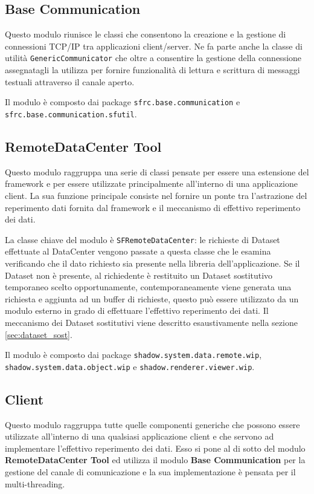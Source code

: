 
\subsection{Base Communication}
\label{sub:basecommodule}
Questo modulo riunisce le classi che consentono la creazione e la gestione di connessioni TCP/IP tra applicazioni client/server. Ne fa parte anche la classe di utilità \texttt{GenericCommunicator} che oltre a consentire la gestione della connessione assegnatagli la utilizza per fornire funzionalità di lettura e scrittura di messaggi testuali attraverso il canale aperto.

Il modulo è composto dai package \texttt{sfrc.base.communication} e \texttt{sfrc.base.communication.sfutil}.

\subsection{RemoteDataCenter Tool}
\label{sub:remotedatacentertoolmodule}
Questo modulo raggruppa una serie di classi pensate per essere una estensione del framework e per essere utilizzate principalmente all'interno di una applicazione client.
La sua funzione principale consiste nel fornire un ponte tra l'astrazione del reperimento dati fornita dal framework e il meccanismo di effettivo reperimento dei dati.

La classe chiave del modulo è \texttt{SFRemoteDataCenter}: le richieste di Dataset effettuate al DataCenter vengono passate a questa classe che le esamina verificando che il dato richiesto sia presente nella libreria dell'applicazione. Se il Dataset non è presente, al richiedente è restituito un Dataset sostitutivo temporaneo scelto opportunamente, contemporaneamente viene generata una richiesta e aggiunta ad un buffer di richieste, questo può essere utilizzato da un modulo esterno in grado di effettuare l'effettivo reperimento dei dati.
Il meccanismo dei Dataset sostitutivi viene descritto esaustivamente nella sezione \ref{sec:dataset_sost}.

Il modulo è composto dai package \texttt{shadow.system.data.remote.wip}, \texttt{shadow.system.data.object.wip} e \texttt{shadow.renderer.viewer.wip}.

\subsection{Client}
\label{sub:clientmodule}
Questo modulo raggruppa tutte quelle componenti generiche che possono essere utilizzate all'interno di una qualsiasi applicazione client e che servono ad implementare l'effettivo reperimento dei dati. 
Esso si pone al di sotto del modulo \textbf{RemoteDataCenter Tool} ed utilizza il modulo \textbf{Base Communication} per la gestione del canale di comunicazione e la sua implementazione è pensata per il multi-threading.

